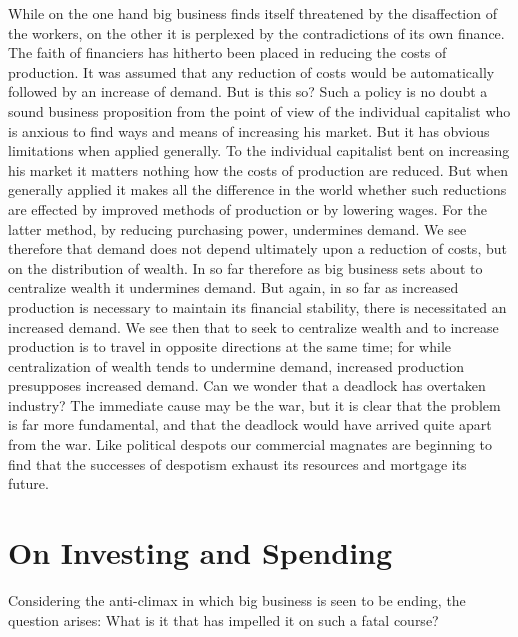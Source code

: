 \documentclass{book}
\begin{document}
While on the one hand big business finds itself threatened by the disaffection of the workers, on the other it is perplexed by the contradictions of its own finance. The faith of financiers has hitherto been placed in reducing the costs of production. It was assumed that any reduction of costs would be automatically followed by an increase of demand. But is this so? Such a policy is no doubt a sound business proposition from the point of view of the individual capitalist who is anxious to find ways and means of increasing his market. But it has obvious limitations when applied generally. To the individual capitalist bent on increasing his market it matters nothing how the costs of production are reduced. But when generally applied it makes all the difference in the world whether such reductions are effected by improved methods of production or by lowering wages. For the latter method, by reducing purchasing power, undermines demand. We see therefore that demand does not depend ultimately upon a reduction of costs, but on the distribution of wealth. In so far therefore as big business sets about to centralize wealth it undermines demand. But again, in so far as increased production is necessary to maintain its financial stability, there is necessitated an increased demand. We see then that to seek to centralize wealth and to increase production is to travel in opposite directions at the same time; for while centralization of wealth tends to undermine demand, increased production presupposes increased demand. Can we wonder that a deadlock has overtaken industry? The immediate cause may be the war, but it is clear that the problem is far more fundamental, and that the deadlock would have arrived quite apart from the war. Like political despots our commercial magnates are beginning to find that the successes of despotism exhaust its resources and mortgage its future.

\chapter{On Investing and Spending}
\label{chapter-4}
Considering the anti-climax in which big business is seen to be ending, the question arises: What is it that has impelled it on such a fatal course?
\end{document}
